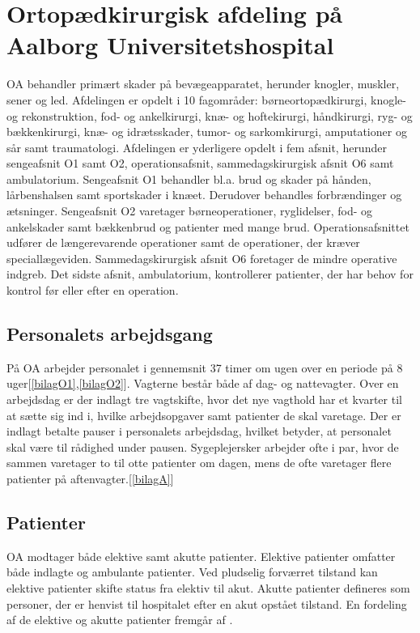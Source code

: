\section{Ortopædkirurgisk afdeling på Aalborg Universitetshospital}
OA behandler primært skader på bevægeapparatet, herunder knogler, muskler, sener og led. Afdelingen er opdelt i 10 fagområder: børneortopædkirurgi, knogle- og rekonstruktion, fod- og ankelkirurgi, knæ- og hoftekirurgi, håndkirurgi, ryg- og bækkenkirurgi, knæ- og idrætsskader, tumor- og sarkomkirurgi, amputationer og sår samt traumatologi. Afdelingen er yderligere opdelt i fem afsnit, herunder sengeafsnit O1 samt O2, operationsafsnit, sammedagskirurgisk afsnit O6 samt ambulatorium. 
Sengeafsnit O1 behandler bl.a. brud og skader på hånden, lårbenshalsen samt sportskader i knæet. Derudover behandles forbrændinger og ætsninger. Sengeafsnit O2 varetager børneoperationer, ryglidelser, fod- og ankelskader samt bækkenbrud og patienter med mange brud. Operationsafsnittet udfører de længerevarende operationer samt de operationer, der kræver speciallægeviden. Sammedagskirurgisk afsnit O6 foretager de mindre operative indgreb. Det sidste afsnit, ambulatorium, kontrollerer patienter, der har behov for kontrol før eller efter en operation.\cite{Aalborg2016}

\subsection{Personalets arbejdsgang} \label{arb_per}
På OA arbejder personalet i gennemsnit 37 timer om ugen over en periode på 8 uger\cite{Danske2015}[\ref{bilagO1},\ref{bilagO2}]. Vagterne består både af dag- og nattevagter. Over en arbejdsdag er der indlagt tre vagtskifte, hvor det nye vagthold har et kvarter til at sætte sig ind i, hvilke arbejdsopgaver samt patienter de skal varetage. Der er indlagt betalte pauser i personalets arbejdsdag, hvilket betyder, at personalet skal være til rådighed under pausen. Sygeplejersker arbejder ofte i par, hvor de sammen varetager to til otte patienter om dagen, mens de ofte varetager flere patienter på aftenvagter.[\ref{bilagA}]

\subsection{Patienter}
OA modtager både elektive samt akutte patienter. Elektive patienter omfatter både indlagte og ambulante patienter. Ved pludselig forværret tilstand kan elektive patienter skifte status fra elektiv til akut. Akutte patienter defineres som personer, der er henvist til hospitalet efter en akut opstået tilstand.\cite{RegionNord2016} En fordeling af de elektive og akutte patienter fremgår af .

